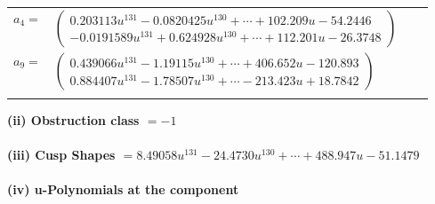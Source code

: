 \documentclass[1p]{elsarticle_modified}
\theoremstyle{definition}
\begin{document}
\begin{tabular}{m{7pt} m{180pt} m{7pt} m{180pt} }
\flushright $a_{4}=$&$\begin{pmatrix}0.203113 u^{131}-0.0820425 u^{130}+\cdots+102.209 u-54.2446\\-0.0191589 u^{131}+0.624928 u^{130}+\cdots+112.201 u-26.3748\end{pmatrix}$ \\
\flushright $a_{9}=$&$\begin{pmatrix}0.439066 u^{131}-1.19115 u^{130}+\cdots+406.652 u-120.893\\0.884407 u^{131}-1.78507 u^{130}+\cdots-213.423 u+18.7842\end{pmatrix}$\\&\end{tabular}
\flushleft \textbf{(ii) Obstruction class $= -1$}\\~\\
\flushleft \textbf{(iii) Cusp Shapes $= 8.49058 u^{131}-24.4730 u^{130}+\cdots+488.947 u-51.1479$}\\~\\
\newpage\renewcommand{\arraystretch}{1}
\flushleft \textbf{(iv) u-Polynomials at the component}\newline \\
\end{document}
